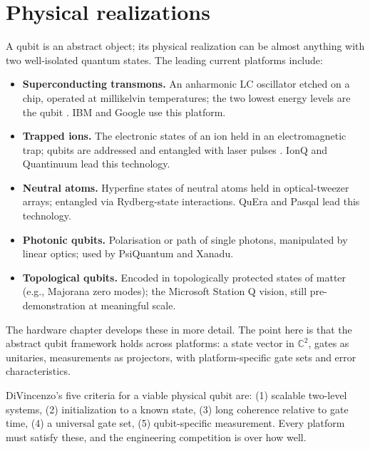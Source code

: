\section{Physical realizations}

A qubit is an abstract object; its physical realization can be almost anything with two well-isolated quantum states. The leading current platforms include:

\begin{itemize}
  \item \textbf{Superconducting transmons.} An anharmonic LC oscillator etched on a chip, operated at millikelvin temperatures; the two lowest energy levels are the qubit \citep{koch_charge-insensitive_2007}. IBM and Google use this platform.
  \item \textbf{Trapped ions.} The electronic states of an ion held in an electromagnetic trap; qubits are addressed and entangled with laser pulses \citep{cirac_quantum_1995}. IonQ and Quantinuum lead this technology.
  \item \textbf{Neutral atoms.} Hyperfine states of neutral atoms held in optical-tweezer arrays; entangled via Rydberg-state interactions. QuEra and Pasqal lead this technology.
  \item \textbf{Photonic qubits.} Polarisation or path of single photons, manipulated by linear optics; used by PsiQuantum and Xanadu.
  \item \textbf{Topological qubits.} Encoded in topologically protected states of matter (e.g., Majorana zero modes); the Microsoft Station Q vision, still pre-demonstration at meaningful scale.
\end{itemize}

The hardware chapter develops these in more detail. The point here is that the abstract qubit framework holds across platforms: a state vector in $\mathbb{C}^2$, gates as unitaries, measurements as projectors, with platform-specific gate sets and error characteristics.

\begin{remark}
DiVincenzo's five criteria \citep{divincenzo_physical_2000} for a viable physical qubit are: (1) scalable two-level systems, (2) initialization to a known state, (3) long coherence relative to gate time, (4) a universal gate set, (5) qubit-specific measurement. Every platform must satisfy these, and the engineering competition is over how well.
\end{remark}

